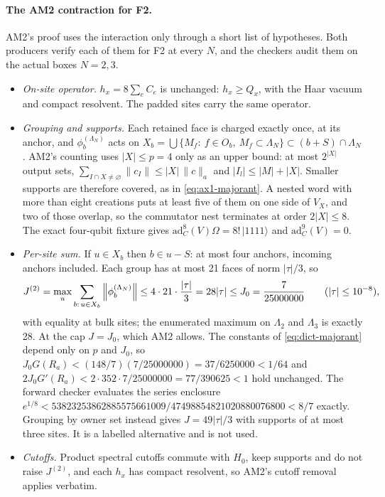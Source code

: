 \paragraph{The AM2 contraction for F2.}
AM2's proof uses the interaction only through a short list of hypotheses.
Both producers verify each of them for F2 at every $N$, and the checkers
audit them on the actual boxes $N=2,3$.
\begin{itemize}
\item \emph{On-site operator.} $h_x=8\sum_eC_e$ is unchanged: $h_x\ge Q_x$,
 with the Haar vacuum and compact resolvent. The padded sites carry the same
 operator.
\item \emph{Grouping and supports.} Each retained face is charged exactly
 once, at its anchor, and $\phi^{(\Lambda_N)}_b$ acts on
 $X_b=\bigcup\{M_f:\ f\in O_b,\ M_f\subset\Lambda_N\}\subset(b+S)\cap\Lambda_N$.
 AM2's counting uses $|X|\le p=4$ only as an upper bound: at most $2^{|X|}$
 output sets, $\sum_{I\cap X\ne\varnothing}\lVert c_I\rVert \le|X|\,\lVert c\rVert_a$ and
 $|I_l|\le|M|+|X|$. Smaller supports are therefore covered, as in
 \eqref{eq:ax1-majorant}. A nested word with more than eight creations puts
 at least five of them on one side of $V_X$, and two of those overlap, so the
 commutator nest terminates at order $2|X|\le8$. The exact four-qubit
 fixture gives $\mathrm{ad}_C^8(V)\Omega=8!\,|1111\rangle$ and
 $\mathrm{ad}_C^9(V)=0$.
\item \emph{Per-site sum.} If $u\in X_b$ then $b\in u-S$: at most four
 anchors, incoming anchors included. Each group has at most 21 faces of norm
 $|\tau|/3$, so
 \begin{equation}
 J^{(2)}=\max_u\sum_{b:\,u\in X_b}\left\lVert\phi^{(\Lambda_N)}_b\right\rVert
 \le4\cdot21\cdot\frac{|\tau|}3=28|\tau|\le J_0=\frac7{25000000}
 \qquad(|\tau|\le10^{-8}),
 \label{eq:ay1-J}
 \end{equation}
 with equality at bulk sites; the enumerated maximum on $\Lambda_2$ and
 $\Lambda_3$ is exactly 28. At the cap $J=J_0$, which AM2 allows. The
 constants of \eqref{eq:dict-majorant} depend only on $p$ and $J_0$, so
 $J_0G(R_a)<(148/7)(7/25000000)=37/6250000<1/64$ and
 $2J_0G'(R_a)<2\cdot352\cdot7/25000000=77/390625<1$ hold unchanged. The forward checker evaluates the series enclosure
 $e^{1/8}<53823253862885575661009/47498854821020880076800<8/7$ exactly.
 Grouping by owner set instead gives $J=49|\tau|/3$ with supports of at most
 three sites. It is a labelled alternative and is not used.
\item \emph{Cutoffs.} Product spectral cutoffs commute with $H_0$, keep
 supports and do not raise $J^{(2)}$, and each $h_x$ has compact resolvent,
 so AM2's cutoff removal applies verbatim.
\end{itemize}
